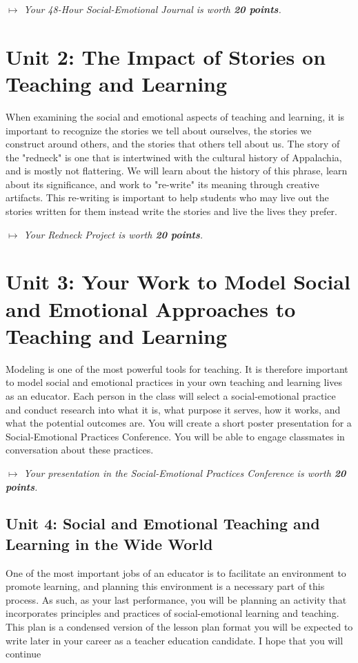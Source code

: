 \documentclass{tufte-handout}
\begin{document}
\medskip\noindent\textit{$\mapsto$ Your 48-Hour Social-Emotional Journal is worth \textbf{20 points}.}

\section{Unit 2: The Impact of Stories on Teaching and Learning}

When examining the social and emotional aspects of teaching and learning, it is important to recognize the stories we tell about ourselves, the stories we construct around others, and the stories that others tell about us. The story of the "redneck" is one that is intertwined with the cultural history of Appalachia, and is mostly not flattering. We will learn about the history of this phrase, learn about its significance, and work to "re-write" its meaning through creative artifacts. This re-writing is important to help students who may live out the stories written for them instead write the stories and live the lives they prefer.

\medskip\noindent\textit{$\mapsto$ Your Redneck Project is worth \textbf{20 points}.}

\section{Unit 3: Your Work to Model Social and Emotional Approaches to Teaching and Learning}

Modeling is one of the most powerful tools for teaching. It is therefore important to model social and emotional practices in your own teaching and learning lives as an educator. Each person in the class will select a social-emotional practice and conduct research into what it is, what purpose it serves, how it works, and what the potential outcomes are. You will create a short poster presentation for a Social-Emotional Practices Conference. You will be able to engage classmates in conversation about these practices.

\medskip\noindent\textit{$\mapsto$ Your presentation in the Social-Emotional Practices Conference is worth \textbf{20 points}.}

\subsection{Unit 4: Social and Emotional Teaching and Learning in the Wide World}

One of the most important jobs of an educator is to facilitate an environment to promote learning, and planning this environment is a necessary part of this process. As such, as your last performance, you will be planning an activity that incorporates principles and practices of social-emotional learning and teaching. This plan is a condensed version of the lesson plan format you will be expected to write later in your career as a teacher education candidate. I hope that you will continue
\end{document}
